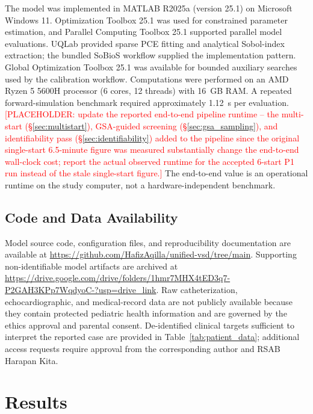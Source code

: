 \documentclass{article}
\begin{document}
The model was implemented in MATLAB R2025a (version 25.1) on Microsoft
Windows 11. Optimization Toolbox 25.1 was used for constrained parameter
estimation, and Parallel Computing Toolbox 25.1 supported parallel model
evaluations. UQLab provided sparse PCE fitting and analytical Sobol-index
extraction; the bundled SoBioS workflow supplied the implementation pattern.
Global Optimization Toolbox 25.1 was available for bounded auxiliary searches
used by the calibration workflow. Computations
were performed on an AMD Ryzen 5 5600H processor (6 cores, 12 threads) with
16~GB RAM. A repeated forward-simulation benchmark required approximately
1.12~s per evaluation. \textcolor{red}{[PLACEHOLDER: update the reported
end-to-end pipeline runtime -- the multi-start (\S\ref{sec:multistart}),
GSA-guided screening (\S\ref{sec:gsa_sampling}), and identifiability pass
(\S\ref{sec:identifiability}) added to the pipeline since the original
single-start 6.5-minute figure was measured substantially change the
end-to-end wall-clock cost; report the actual observed runtime for the
accepted 6-start P1 run instead of the stale single-start figure.]} The
end-to-end value is an operational runtime on the study computer, not a
hardware-independent benchmark.

\subsection{Code and Data Availability}
\label{sec:availability}

Model source code, configuration files, and reproducibility documentation
are available at \url{https://github.com/HafizAqilla/unified-vsd/tree/main}.
Supporting non-identifiable model artifacts are archived at
\url{https://drive.google.com/drive/folders/1hmr7MHX4tED3q7-P2GAH3KPp7WqdyoC-?usp=drive_link}.
Raw catheterization, echocardiographic, and medical-record data are not
publicly available because they contain protected pediatric health
information and are governed by the ethics approval and parental consent.
De-identified clinical targets sufficient to interpret the reported case
are provided in Table~\ref{tab:patient_data}; additional access requests
require approval from the corresponding author and RSAB Harapan Kita.

\section{Results}
\label{sec:results}
\end{document}
